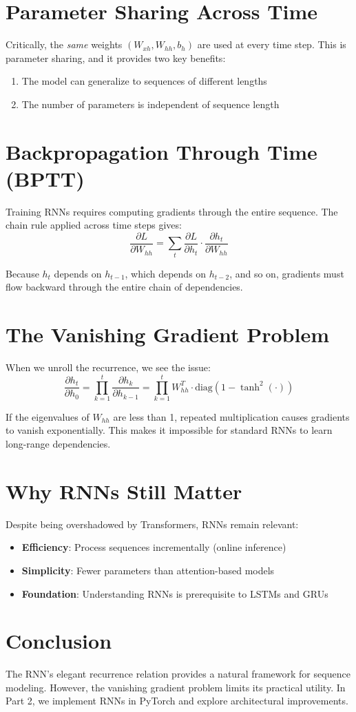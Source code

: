 \documentclass[12pt]{article}
\begin{document}
\section{Parameter Sharing Across Time}
Critically, the \textit{same} weights $(W_{xh}, W_{hh}, b_h)$ are used at every time step. This is parameter sharing, and it provides two key benefits:
\begin{enumerate}
    \item The model can generalize to sequences of different lengths
    \item The number of parameters is independent of sequence length
\end{enumerate}

\section{Backpropagation Through Time (BPTT)}
Training RNNs requires computing gradients through the entire sequence. The chain rule applied across time steps gives:
\begin{equation}
    \frac{\partial L}{\partial W_{hh}} = \sum_t \frac{\partial L}{\partial h_t} \cdot \frac{\partial h_t}{\partial W_{hh}}
\end{equation}

Because $h_t$ depends on $h_{t-1}$, which depends on $h_{t-2}$, and so on, gradients must flow backward through the entire chain of dependencies.

\section{The Vanishing Gradient Problem}
When we unroll the recurrence, we see the issue:
\begin{equation}
    \frac{\partial h_t}{\partial h_0} = \prod_{k=1}^{t} \frac{\partial h_k}{\partial h_{k-1}} = \prod_{k=1}^{t} W_{hh}^T \cdot \text{diag}(1 - \tanh^2(\cdot))
\end{equation}

If the eigenvalues of $W_{hh}$ are less than 1, repeated multiplication causes gradients to vanish exponentially. This makes it impossible for standard RNNs to learn long-range dependencies.

\section{Why RNNs Still Matter}
Despite being overshadowed by Transformers, RNNs remain relevant:
\begin{itemize}
    \item \textbf{Efficiency}: Process sequences incrementally (online inference)
    \item \textbf{Simplicity}: Fewer parameters than attention-based models
    \item \textbf{Foundation}: Understanding RNNs is prerequisite to LSTMs and GRUs
\end{itemize}

\section{Conclusion}
The RNN's elegant recurrence relation provides a natural framework for sequence modeling. However, the vanishing gradient problem limits its practical utility. In Part 2, we implement RNNs in PyTorch and explore architectural improvements.
\end{document}
